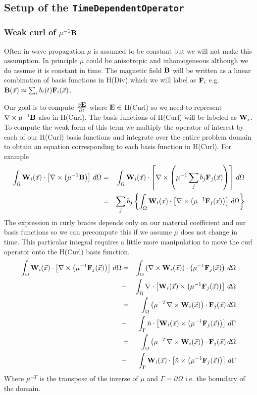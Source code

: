 \documentclass[12pt]{article}
\providecommand{\B}{\mbox{\bf B}}
\providecommand{\E}{\mbox{\bf E}}
\providecommand{\F}{\mbox{\bf F}}
\providecommand{\W}{\mbox{\bf W}}
\providecommand{\x}{\vec{x}}
\newcommand{\Div}{\nabla\cdot}
\newcommand{\Curl}{\nabla\times}
\begin{document}
\subsection{Setup of the {\tt TimeDependentOperator}}

\subsubsection{Weak curl of $\mu^{-1}\B$}

Often in wave propagation $\mu$ is assumed to be constant but we will
not make this assumption. In principle $\mu$ could be anisotropic and
inhomogeneous although we do assume it is constant in time. The
magnetic field $\B$ will be written as a linear combination of basis
functions in H(Div) which we will label as $\F_i$
e.g. $\B(\x)\approx\sum_i b_i(t)\F_i(\x)$.

Our goal is to compute $\frac{\partial\E}{\partial t}$ where $\E\in$
H(Curl) so we need to represent $\Curl\mu^{-1}\B$ also in H(Curl).
The basis functions of H(Curl) will be labeled as $\W_i$. To compute
the weak form of this term we multiply the operator of interest by
each of our H(Curl) basis functions and integrate over the entire
problem domain to obtain an equation corresponding to each basis
function in H(Curl). For example
\begin{eqnarray*}
  \int_\Omega\W_i(\x)\cdot\left[\Curl\left(\mu^{-1}\B\right)\right]\,d\Omega
  &=& \int_\Omega\W_i(\x)\cdot\left[\Curl\left(\mu^{-1}\sum_jb_j\F_j(\x)\right)\right]\,d\Omega\\
  &=& \sum_jb_j\left\{\int_\Omega\W_i(\x)\cdot\left[\Curl\left(\mu^{-1}\F_j(\x)\right)\right]\,d\Omega\right\}
\end{eqnarray*}
The expression in curly braces depends only on our material
coefficient and our basis functions so we can precompute this if we
assume $\mu$ does not change in time. This particular integral
requires a little more manipulation to move the curl operator onto the
H(Curl) basis function.
\begin{eqnarray*}
  \int_\Omega\W_i(\x)\cdot\left[\Curl\left(\mu^{-1}\F_j(\x)\right)\right]\,d\Omega &=&
  \int_\Omega\left(\Curl\W_i(\x)\right)\cdot\left(\mu^{-1}\F_j(\x)\right)\,d\Omega \\
  &-&  \int_\Omega\Div\left[\W_i(\x)\times\left(\mu^{-1}\F_j(\x)\right)\right]\,d\Omega \\
  &=&
  \int_\Omega\left(\mu^{-T}\Curl\W_i(\x)\right)\cdot\F_j(\x)\,d\Omega \\
  &-&  \int_\Gamma\hat{n}\cdot\left[\W_i(\x)\times\left(\mu^{-1}\F_j(\x)\right)\right]\,d\Gamma \\
  &=&
  \int_\Omega\left(\mu^{-T}\Curl\W_i(\x)\right)\cdot\F_j(\x)\,d\Omega \\
  &+&  \int_\Gamma\W_i(\x)\cdot\left[\hat{n}\times\left(\mu^{-1}\F_j(\x)\right)\right]\,d\Gamma
\end{eqnarray*}
Where $\mu^{-T}$ is the transpose of the inverse of $\mu$ and
$\Gamma=\partial\Omega$ i.e. the boundary of the domain.
\end{document}
